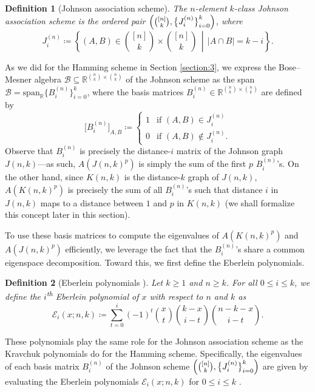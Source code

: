 \documentclass{article}
\def\R{\mathbb{R}}
\def\Ein{\mathcal{E}}
\numberwithin{equation}{section}
\theoremstyle{plain}
\newtheorem{definition}{Definition}
\begin{document}
\begin{definition}[Johnson association scheme]\label{defn:10}
    The $n$-element $k$-class \emph{Johnson association scheme} is the ordered pair $\Bigl(\binom{[n]}{k}, \bigl\{J_i^{(n)}\bigr\}_{i = 0}^k\Bigr)$, where
    \[J_i^{(n)} \coloneqq \left\{(A, B) \in \binom{[n]}{k} \times \binom{[n]}{k}\, \middle|\, \lvert A \cap B \rvert = k - i\right\}.\]
\end{definition}

As we did for the Hamming scheme in Section \ref{section:3}, we express the Bose--Mesner algebra $\mathcal{B} \subseteq \R^{\binom{n}{k} \times \binom{n}{k}}$ of the Johnson scheme as the span $\mathcal{B} = \mathrm{span}_\R\bigl\{B_i^{(n)}\bigr\}_{i = 0}^k$, where the basis matrices $B_i^{(n)} \in \R^{\binom{n}{k} \times \binom{n}{k}}$ are defined by
\[\bigl[B_i^{(n)}\bigr]_{A,B} \coloneqq \begin{cases}
    1 & \text{if } (A, B) \in J_i^{(n)} \\
    0 & \text{if } (A, B) \notin J_i^{(n)}.
\end{cases}\]
Observe that $B_i^{(n)}$ is precisely the distance-$i$ matrix of the Johnson graph $J(n, k)$---as such, $A(J(n, k)^p)$ is simply the sum of the first $p$ $B_i^{(n)}$'s. On the other hand, since $K(n, k)$ is the distance-$k$ graph of $J(n, k)$, $A(K(n, k)^p)$ is precisely the sum of all $B_i^{(n)}$'s such that distance $i$ in $J(n, k)$ maps to a distance between $1$ and $p$ in $K(n, k)$ (we shall formalize this concept later in this section).

To use these basis matrices to compute the eigenvalues of $A(K(n, k)^p)$ and $A(J(n, k)^p)$ efficiently, we leverage the fact that the $B_i^{(n)}$'s share a common eigenspace decomposition. Toward this, we first define the Eberlein polynomials.

\begin{definition}[Eberlein polynomials \cite{Del73}]\label{defn:11}
    Let $k \ge 1$ and $n \ge k$. For all $0 \le i \le k$, we define the $i$\textsuperscript{th} \emph{Eberlein polynomial} of $x$ with respect to $n$ and $k$ as
    \[\Ein_i(x; n, k) \coloneqq \sum_{t = 0}^i (-1)^t \binom{x}{t} \binom{k - x}{i - t} \binom{n - k - x}{i - t}.\]
\end{definition}

These polynomials play the same role for the Johnson association scheme as the Kravchuk polynomials do for the Hamming scheme. Specifically, the eigenvalues of each basis matrix $B_i^{(n)}$ of the Johnson scheme $\Bigl(\binom{[n]}{k}, \bigl\{J_i^{(n)}\bigr\}_{i = 0}^k\Bigr)$ are given by evaluating the Eberlein polynomials $\Ein_i(x; n, k)$ for $0 \le i \le k$ \cite[p. 220]{BI84}.
\end{document}
